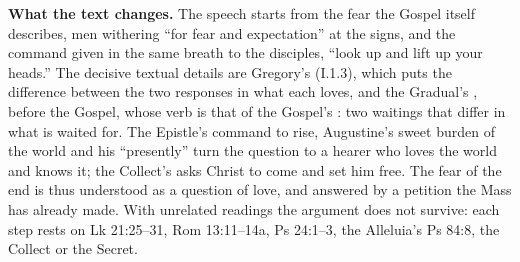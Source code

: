 {\textbf{What the text changes.} The speech starts from the fear the Gospel
itself describes, men withering ``for fear and expectation'' at the signs, and
the command given in the same breath to the disciples, ``look up and lift up
your heads.'' The decisive textual details are Gregory's  (I.1.3), which puts the difference between the
two responses in what each loves, and the Gradual's ,
before the Gospel, whose verb is that of the Gospel's :
two waitings that differ in what is waited for. The Epistle's command to rise,
Augustine's sweet burden of the world and his ``presently'' turn the question
to a hearer who loves the world and knows it; the Collect's  asks Christ to come and set him free. The fear of the end
is thus understood as a question of love, and answered by a petition the Mass
has already made. With unrelated readings the argument does not survive: each
step rests on Lk 21:25--31, Rom 13:11--14a, Ps 24:1--3, the Alleluia's Ps
84:8, the Collect or the Secret.

}
